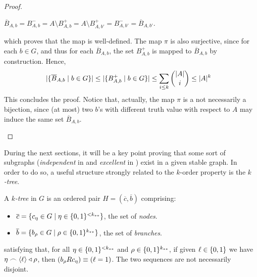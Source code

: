 \begin{corollary}[Claim 2.6.1]
\begin{proof}
\begin{enumerate}
\begin{itemize}
                        $\overline{B}_{A,b} = B^-_{A,b} = A \setminus B^+_{A,b} = A \setminus B^+_{A,b'} = B^-_{A,b'} = \overline{B}_{A,b'}$.
                    \end{itemize}
                    which proves that the map is well-defined.
                    The map $\pi$ is also surjective, since for each $b \in G$, and thus for each $\overline{B}_{A,b}$,
                    the set $B^+_{A,b}$ is mapped to $\overline{B}_{A,b}$ by construction.
                    Hence,
                    \[
                        | \{ \overline{B}_{A,b} \mid b \in G \} | \leq
                        | \{ B^+_{A,b} \mid b \in G \} | \leq
                        \sum_{i \leq k} \binom{|A|}{i} \leq |A|^k
                    \]
                    This concludes the proof.
                    Notice that, actually, the map $\pi$ is a not necessarily a bijection, since (at most) two $b$'s with
                    different truth value with respect to $A$ may induce the same set $\overline{B}_{A,b}$.
            \end{enumerate}
        \end{proof}
    \end{corollary}

    During the next sections, it will be a key point proving that some sort of  subgraphs
    (\emph{independent} in  and \emph{excellent} in ) exist in a given
    stable graph.
    In order to do so, a useful structure strongly related to the $k$-order property is the \emph{$k$-tree}.

    \begin{definition} \label{def:k-tree}
        A \emph{$k$-tree} in $G$ is an ordered pair $H = (\overline{c},\overline{b})$ comprising:
        \begin{itemize}
            \item $\overline{c} = \{  c_\eta \in G \mid \eta \in \{ 0,1 \}^{<k_{**}}  \}$, the set of \emph{nodes}.
            \item $\overline{b} = \{  b_\rho \in G \mid \rho \in \{ 0,1 \}^{k_{**}}  \}$, the set of \emph{branches}.
        \end{itemize}
        satisfying that, for all $\eta \in \{ 0,1 \}^{<k_{**}}$ and $\rho \in \{ 0,1 \}^{k_{**}}$,
        if given $\ell \in \{ 0, 1 \}$ we have $\eta \frown \left< \ell \right> \triangleleft \rho$, then
        $( b_\rho R c_\eta ) \equiv ( \ell = 1 )$.
        The two sequences are not necessarily disjoint. 
    \end{definition}

